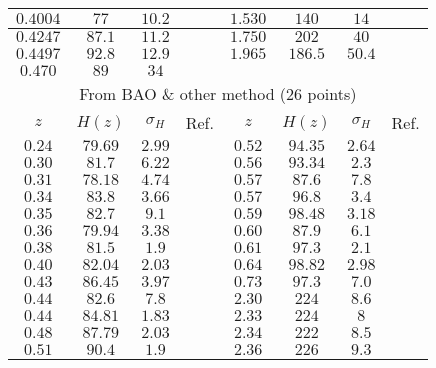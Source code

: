 \begin{center}
\begin{tabular}{|c|c|c|c|c|c|c|c|}
$0.4004$ & $77$ & $10.2$ & \cite{h5} & $1.530$ & $140$ & $14$ & \cite{h2} \\ \hline
$0.4247$ & $87.1$ & $11.2$ & \cite{h5} & $1.750$ & $202$ & $40$ & \cite{h2} \\ \hline
$0.4497$ & $92.8$ & $12.9$ & \cite{h5} & $1.965$ & $186.5$ & $50.4$ & \cite{h7}  \\ \hline
$0.470$ & $89$ & $34$ & \cite{h6} &  &  &  &   \\ \hline
\multicolumn{8}{|c|}{From BAO \& other method (26 points)} \\ \hline
$z$ & $H(z)$ & $\sigma _{H}$ & Ref. & $z$ & $H(z)$ & $\sigma _{H}$ & Ref. \\ \hline
$0.24$ & $79.69$ & $2.99$ & \cite{h8} & $0.52$ & $94.35$ & $2.64$ & \cite{h10} \\ \hline
$0.30$& $81.7$ & $6.22$ & \cite{h9} & $0.56$ & $93.34$ & $2.3$ & \cite{h10} \\ \hline
$0.31$ & $78.18$ & $4.74$ & \cite{h10} & $0.57$ & $87.6$ & $7.8$ & \cite{h14} \\ \hline
$0.34$ & $83.8$ & $3.66$ & \cite{h8} & $0.57$ & $96.8$ & $3.4$ & \cite{h15} \\ \hline
$0.35$ & $82.7$ & $9.1$ & \cite{h11} & $0.59$ & $98.48$ & $3.18$ & \cite{h10} \\ \hline
$0.36$ & $79.94$ & $3.38$ & \cite{h10} & $0.60$ & $87.9$ & $6.1$ & \cite{h13} \\ \hline
$0.38$ & $81.5$ & $1.9$ & \cite{h12} & $0.61$ & $97.3$ & $2.1$ & \cite{h12} \\ \hline
$ 0.40$ & $82.04$ & $2.03$ & \cite{h10} & $0.64$ & $98.82$ & $2.98$ & \cite{h10}  \\ \hline
$0.43$ & $86.45$ & $3.97$ & \cite{h8} & $0.73$ & $97.3$ & $7.0$ & \cite{h13} \\ \hline
$0.44$ & $82.6$ & $7.8$ & \cite{h13} & $2.30$ & $224$ & $8.6$ & \cite{h16} \\ \hline
$0.44$ & $84.81$ & $1.83$ & \cite{h10} & $2.33$ & $224$ & $8$ & \cite{h17} \\ \hline
$0.48$ & $87.79$ & $2.03$ & \cite{h10} & $2.34$ & $222$ & $8.5$ & \cite{h18} \\ \hline
$0.51$ & $90.4$ & $1.9$ & \cite{h12} & $2.36$ & $226$ & $9.3$ & \cite{h19} \\ \hline
\end{tabular}
\end{center}


